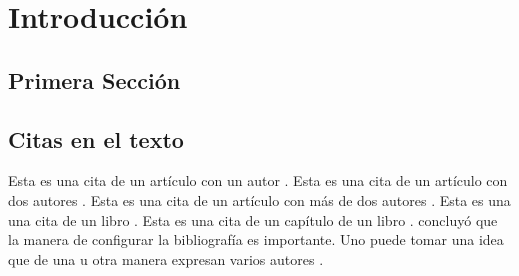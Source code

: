 \chapter{Introducción}
\lipsum[1-1]

\section{Primera Sección}
\lipsum[2]

\section{Citas en el texto}

Esta es una cita de un artículo con un autor \citep{henderson1999}.
Esta es una cita de un artículo con dos autores \citep{alvarado2005}.
Esta es una cita de un artículo con más de dos autores \citep{schwarz2017}. 
Esta es una una cita de un libro \citep{henderson2002}.
Esta es una cita de un capítulo de un libro \citep{coppard2013}.
\citet{henderson1999} concluyó que la manera de configurar la bibliografía es importante.
Uno puede tomar una idea que de una u otra manera expresan varios autores \citep{henderson1999,schwarz2017,coppard2013}.